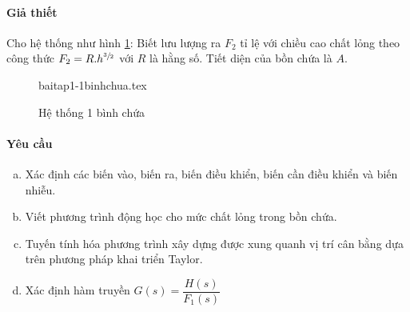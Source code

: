 \paragraph{Giả thiết}
    Cho hệ thống như hình \ref{baitap1-1binhchua}: Biết lưu lượng ra $F_2$ tỉ lệ với chiều cao chất lỏng theo công thức $F_2 = R.h^{\sfrac{3}{2}}$ với $R$ là hằng số. Tiết diện của bồn chứa là $A$.
    \begin{figure}[htp]
        \begin{center}
            {baitap1-1binhchua.tex}
        \end{center}
        \caption{Hệ thống 1 bình chứa} \label{baitap1-1binhchua}
    \end{figure}

\paragraph{Yêu cầu}
    \begin{enumerate}[a.]
        \item Xác định các biến vào, biến ra, biến điều khiển, biến cần điều khiển và biến nhiễu.
        \item Viết phương trình động học cho mức chất lỏng trong bồn chứa.
        \item Tuyến tính hóa phương trình xây dựng được xung quanh vị trí cân bằng dựa trên phương pháp khai triển Taylor.
        \item Xác định hàm truyền $G(s) = \dfrac{H(s)}{F_1(s)}$
    \end{enumerate}

